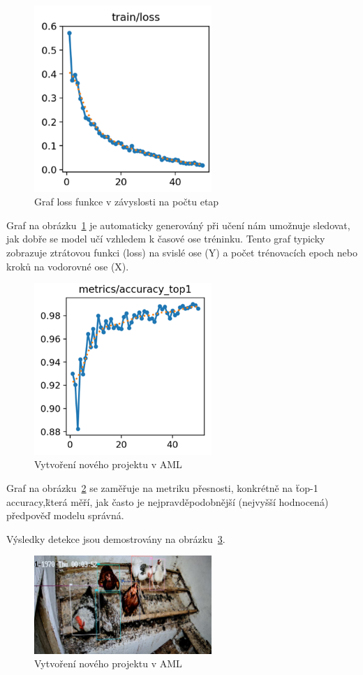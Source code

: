 \begin{figure}[htbp]
    \centering
    \includegraphics[width=0.6\textwidth]{img/loss_funkce}
    \caption{Graf loss funkce v závyslosti na počtu etap}
    \label{fig:loss_funkce}
\end{figure}

Graf na obrázku~\ref{fig:loss_funkce} je automaticky generováný při učení nám umožnuje sledovat, jak dobře se model učí vzhledem k časové ose tréninku.
Tento graf typicky zobrazuje ztrátovou funkci (loss) na svislé ose (Y) a počet trénovacích epoch nebo kroků na vodorovné ose (X).

\begin{figure}[htbp]
    \centering
    \includegraphics[width=0.6\textwidth]{img/top1_accuracy}
    \caption{Vytvoření nového projektu v AML}
    \label{fig:top1_accuracy}
\end{figure}

Graf na obrázku~\ref{fig:top1_accuracy} se zaměřuje na metriku přesnosti, konkrétně na \"top-1 accuracy,\" která měří, jak často je nejpravděpodobnější (nejvyšší hodnocená) předpověď modelu správná.

Výsledky detekce jsou demostrovány na obrázku~\ref{fig:detekce_slepic}.

\begin{figure}[htbp]
    \centering
    \includegraphics[width=0.6\textwidth]{img/detekce_slepic}
    \caption{Vytvoření nového projektu v AML}
    \label{fig:detekce_slepic}
\end{figure}
